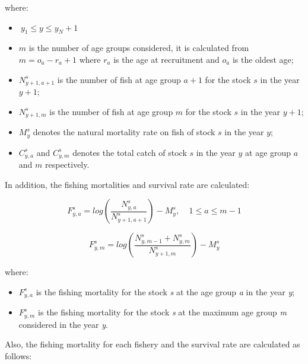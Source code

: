 \documentclass{article}
\begin{document}
where:
\begin{itemize}
    \item $\ y_1\leq y \leq y_N+1$
    \item $m$ is the number of age groups considered, it is calculated from $m=o_a-r_a+1$ where $r_a$ is the age at recruitment and $o_a$ is the oldest age;
    
    \item $N^{s}_{y+1,a+1}$ is the number of fish at age group $a+1$ for the stock $s$ in the year $y+1$;

    \item $N^{s}_{y+1,m}$ is the number of fish at age group $m$ for the stock $s$ in the year $y+1$;

    \item $M^{s}_{y}$ denotes the natural mortality rate on fish of stock $s$ in the year $y$;

    \item $C^s_{y,a}$ and $C^s_{y,m}$ denotes the total catch of stock $s$ in the year $y$ at age group $a$ and $m$ respectively.
    
\end{itemize}

\hfill

In addition, the fishing mortalities and survival rate are calculated:

\begin{equation}
F^s_{y,a}=log\left(\dfrac{N^s_{y,a}}{N^s_{y+1,a+1}}\right)-M^s_y, \ \ \ \ \ 1\leq a \leq m-1
\end{equation}

\begin{equation}
F^s_{y,m}=log\left(\dfrac{N^s_{y,m-1}+N^s_{y,m}}{N^s_{y+1,m}}\right)-M^s_y
\end{equation}

where:

\begin{itemize}
    \item $F^s_{y,a}$ is the fishing mortality for the stock \textit{s} at the age group \textit{a} in the year \textit{y};

    \item $F^s_{y,m}$ is the fishing mortality for the stock \textit{s} at the maximum age group \textit{m} considered in the year \textit{y}.
\end{itemize}

\hfill

Also, the fishing mortality for each fishery and the survival rate are calculated as follows:
\end{document}
